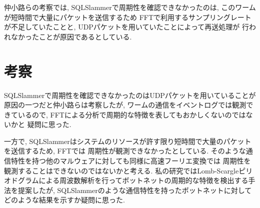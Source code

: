 \documentclass[twocolumn,9]{ltjsarticle}
\begin{document}
仲小路らの考察では, SQLSlammerで周期性を確認できなかったのは, このワームが短時間で大量にパケットを送信するため
FFTで利用するサンプリングレートが不足していたことと, UDPパケットを用いていたことによって再送処理が
行われなかったことが原因であるとしている. 

\section{考察}
SQLSlammerで周期性を確認できなかったのはUDPパケットを用いていることが原因の一つだと仲小路らは考察したが, 
ワームの通信をイベントログでは観測できているので, FFTによる分析で周期的な特徴を表してもおかしくないのではないかと
疑問に思った.

一方で, SQLSlammerはシステムのリソースが許す限り短時間で大量のパケットを送信するため, FFTでは
周期性が観測できなかったとしている. そのような通信特性を持つ他のマルウェアに対しても同様に高速フーリエ変換では
周期性を観測することはできないのではないかと考える. 
私の研究ではLomb-Scargleピリオドグラムによる周波数解析を行ってボットネットの周期的な特徴を検出する手法を提案したが, 
SQLSlammerのような通信特性を持ったボットネットに対してどのような結果を示すか疑問に思った. 



\end{document}
